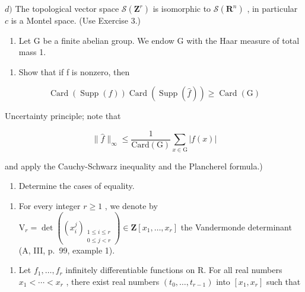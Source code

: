 \(d)\) The topological vector space \(\mathcal{S}(\mathbf{Z}^{r})\) is isomorphic to \(\mathcal{S}(\mathbf{R}^{n})\) , in particular \(c\) is a Montel space. (Use Exercise 3.)

\begin{enumerate}
\def\labelenumi{\arabic{enumi})}
\setcounter{enumi}{31}
\tightlist
\item
  Let G be a finite abelian group. We endow G with the Haar measure of total mass 1.
\end{enumerate}

\begin{enumerate}
\def\labelenumi{\alph{enumi})}
\tightlist
\item
  Show that if f is nonzero, then
\end{enumerate}

\[
\operatorname{Card} (\operatorname{Supp} (f)) \operatorname{Card} (\operatorname{Supp} (\widehat {f})) \geqslant \operatorname{Card} (\mathrm{G})
\]

Uncertainty principle; note that

\[
\| \widehat {f} \| _ {\infty} \leqslant \frac {1}{\mathrm{Card(G)}} \sum_ {x \in \mathrm{G}} | f (x) |
\]

and apply the Cauchy-Schwarz inequality and the Plancherel formula.)

\begin{enumerate}
\def\labelenumi{\alph{enumi})}
\setcounter{enumi}{1}
\tightlist
\item
  Determine the cases of equality.
\end{enumerate}

\begin{enumerate}
\def\labelenumi{\arabic{enumi})}
\setcounter{enumi}{32}
\tightlist
\item
  For every integer \(r \geqslant 1\) , we denote by \(\mathrm{V}_{r} = \det((x_{i}^{j})_{\substack{1 \leqslant i \leqslant r \\ 0 \leqslant j < r}}) \in \mathbf{Z}[x_{1}, \ldots, x_{r}]\) the Vandermonde determinant (A, III, p.~99, example 1).
\end{enumerate}

\begin{enumerate}
\def\labelenumi{\alph{enumi})}
\tightlist
\item
  Let \(f_{1}, \ldots, f_{r}\) infinitely differentiable functions on R. For all real numbers \(x_{1} < \cdots < x_{r}\) , there exist real numbers \((t_{0}, \ldots, t_{r-1})\) into \([x_{1}, x_{r}]\) such that
\end{enumerate}

